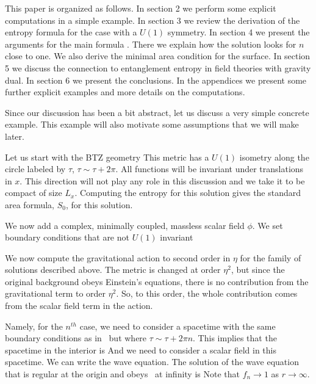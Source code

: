 This paper is organized as follows. In section 2 we perform some explicit computations in a simple example.
In section 3 we review the derivation of the entropy formula for the case with a $U(1)$ symmetry.
In section 4 we present the arguments for the main formula \RTconj . There we explain how the solution looks for
$n$ close to one.  We also derive the minimal area condition for the surface.
In section 5 we discuss the connection to entanglement entropy in field theories with gravity dual.
In section 6 we present the conclusions. In the appendices we present some further explicit examples and more details
on the computations.





Since our discussion has been a bit abstract, let us discuss a very simple
concrete example. This example will also motivate some assumptions that we will make
later.

Let us start with the BTZ geometry
\eqn{}
This metric has a $U(1)$ isometry along the circle labeled by $\tau$,  $\tau \sim \tau + 2 \pi $.
All functions will be invariant under translations in $x$. This direction will not play any
role in this discussion and we take it to be compact of size $L_x$.
 Computing the entropy for this solution gives the standard area formula, $S_0$, for this
solution.


We now add a complex, minimally coupled,  massless scalar field $\phi$.
We  set boundary conditions  that
are not $U(1)$ invariant
\eqn{}

We now compute the gravitational action to second order in $\eta $ for the family of solutions
described above. The metric is changed at order $\eta^2$, but since the original background obeys Einstein's equations,
there is no contribution from the gravitational term to order $\eta^2$.   So, to this order, the whole contribution comes
from the scalar field term in the action.

Namely, for the $n^{th}$ case, we need to consider a spacetime with the same boundary conditions as in
\bcsp\ but where $\tau \sim \tau + 2 \pi n $. This implies that the spacetime in the interior is
\eqn{}
And we need to consider a scalar field in this spacetime.
We can write the wave equation.
 The solution of the wave equation that is regular at the origin and obeys  \bcsp\ at infinity  is
\eqn{}
Note that $f_n \to 1 $ as $r \to \infty $.

